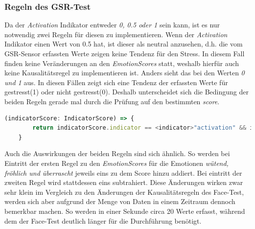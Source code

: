\subsubsection{Regeln des GSR-Test}
Da der \textit{Activation} Indikator entweder \textit{0, 0.5 oder 1} sein kann, ist es nur notwendig zwei Regeln für diesen zu implementieren. Wenn der \textit{Activation} Indikator einen Wert von 0.5 hat, ist dieser als neutral anzusehen, d.h. die vom GSR-Sensor erfassten Werte zeigen keine Tendenz für den Stress. In diesem Fall finden keine Veränderungen an den \textit{EmotionScores} statt, weshalb hierfür auch keine Kausalitätsregel zu implementieren ist. Anders sieht das bei den Werten \textit{0 und 1} aus. In diesen Fällen zeigt sich eine Tendenz der erfassten Werte für gestresst(1) oder nicht gestresst(0). Deshalb unterscheidet sich die Bedingung der beiden Regeln gerade mal durch die Prüfung auf den bestimmten \textit{score}. \newline
\begin{lstlisting}[caption={Bedingung der ersten Kausalitätsregel(gestresst)}, language=JavaScript]
	(indicatorScore: IndicatorScore) => {
		return indicatorScore.indicator == <indicator>"activation" && indicatorScore.score == 1;
	}
\end{lstlisting}
Auch die Auswirkungen der beiden Regeln sind sich ähnlich. So werden bei Eintritt der ersten Regel zu den \textit{EmotionScores} für die Emotionen \textit{wütend, fröhlich und überrascht} jeweils eins zu dem Score hinzu addiert. Bei eintritt der zweiten Regel wird stattdessen eins subtrahiert. Diese Änderungen wirken zwar sehr klein im Vergleich zu den Änderungen der Kausalitätsregeln des Face-Test, werden sich aber aufgrund der Menge von Daten in einem Zeitraum dennoch bemerkbar machen. So werden in einer Sekunde circa 20 Werte erfasst, während dem der Face-Test deutlich länger für die Durchführung benötigt.
